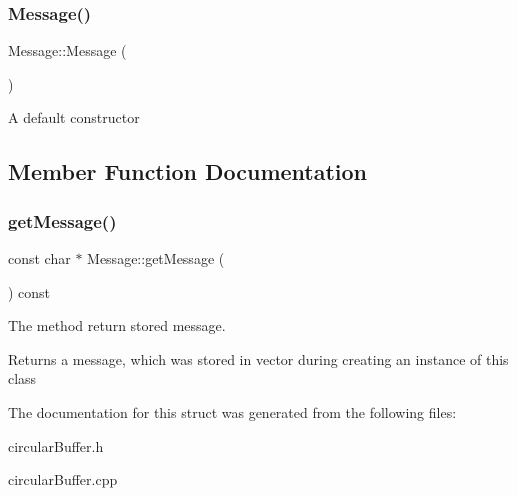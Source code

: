 \subsubsection{\texorpdfstring{Message()}{Message()}\hspace{0.1cm}{\footnotesize\ttfamily [2/2]}}
{\footnotesize\ttfamily Message\+::\+Message (\begin{DoxyParamCaption}{ }\end{DoxyParamCaption})\hspace{0.3cm}{\ttfamily [default]}}

A default constructor 

\subsection{Member Function Documentation}
\mbox{\label{structMessage_a7b0cfcdc5aa34356b38468b9ac390abb}} 
\subsubsection{\texorpdfstring{get\+Message()}{getMessage()}}
{\footnotesize\ttfamily const char $\ast$ Message\+::get\+Message (\begin{DoxyParamCaption}{ }\end{DoxyParamCaption}) const}

The method return stored message. \begin{DoxyReturn}{Returns}
a message, which was stored in vector during creating an instance of this class 
\end{DoxyReturn}


The documentation for this struct was generated from the following files\+:\begin{DoxyCompactItemize}
\item 
circular\+Buffer.\+h\item 
circular\+Buffer.\+cpp\end{DoxyCompactItemize}
